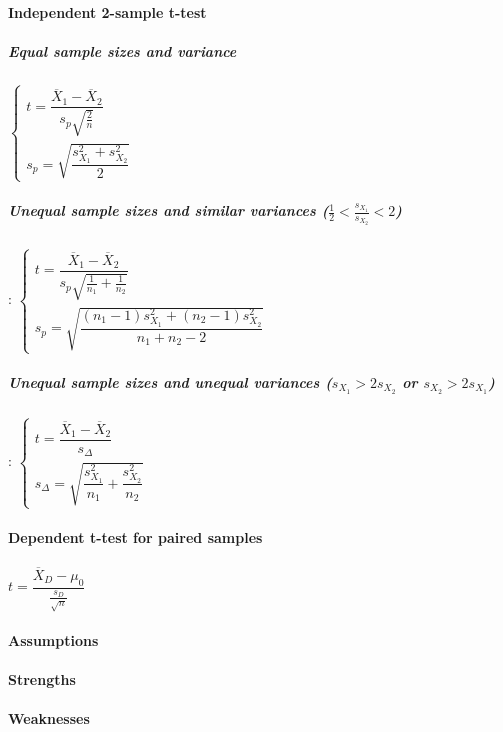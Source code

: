 \paragraph{Independent 2-sample t-test}
\subparagraph{Equal sample sizes and variance}
$\begin{cases}
    t = \dfrac{\overline{X}_{1}-\overline{X}_{2}}{s_{p}\sqrt{\frac{2}{n}}} \\
    s_{p} = \sqrt{\dfrac{s_{X_{1}}^{2} + s_{X_{2}}^{2}}{2}}
\end{cases}$

\subparagraph{Unequal sample sizes and similar variances ($\frac{1}{2}<\frac{s_{X_{1}}}
{s_{X_{2}}}<2$)}:
$\begin{cases}
    t = \dfrac{\overline{X}_{1}-\overline{X}_{2}}{s_{p}\sqrt{\frac{1}{n_{1}} + 
    \frac{1}{n_{2}}}} \\
    s_{p} = \sqrt{\dfrac{(n_{1}-1)s_{X_{1}}^{2} + (n_{2}-1)s_{X_{2}}^{2}}{n_{1} + n_{2}
    -2}}
\end{cases}$

\subparagraph{Unequal sample sizes and unequal variances ($s_{X_{1}} > 2s_{X_{2}}$ 
or $s_{X_{2}} > 2s_{X_{1}}$)}:
$\begin{cases}
    t = \dfrac{\overline{X}_{1}-\overline{X}_{2}}{s_{\Delta}} \\
    s_{\Delta} = \sqrt{\dfrac{s_{X_{1}}^{2}}{n_{1}}+\dfrac{s_{X_{2}}^{2}}{n_{2}}}
\end{cases}$

\paragraph{Dependent t-test for paired samples}
$t=\dfrac{\overline{X}_{D} - \mu_{0}}{\frac{s_{D}}{\sqrt{n}}}$
\paragraph{Assumptions}
\paragraph{Strengths}
\paragraph{Weaknesses}
